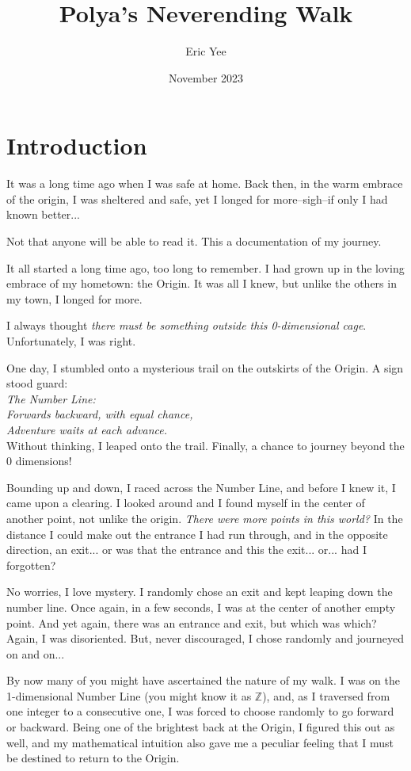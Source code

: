 \documentclass{article}
\title{Polya's Neverending Walk}
\author{Eric Yee}
\date{November 2023}
\begin{document}
\maketitle

\section{Introduction}
It was a long time ago when I was safe at home. Back then, in the warm embrace of the origin, I was sheltered and safe, yet I longed for more--sigh--if only I had known better... 

Not that anyone will be able to read it. This a documentation of my journey.

It all started a long time ago, too long to remember. I had grown up in the loving embrace of my hometown: the Origin. It was all I knew, but unlike the others in my town, I longed for more. 

I always thought \emph{there must be something outside this 0-dimensional cage}. Unfortunately, I was right.

One day, I stumbled onto a mysterious trail on the outskirts of the Origin. A sign stood guard:\\
\emph{
The Number Line: \\
Forwards backward, with equal chance,\\
Adventure waits at each advance.\\
}
Without thinking, I leaped onto the trail. Finally, a chance to journey beyond the 0 dimensions! 

Bounding up and down, I raced across the Number Line, and before I knew it, I came upon a clearing. I looked around and I found myself in the center of another point, not unlike the origin. \emph{There were more points in this world?} In the distance I could make out the entrance I had run through, and in the opposite direction, an exit... or was that the entrance and this the exit... or... had I forgotten? 


No worries, I love mystery. I randomly chose an exit and kept leaping down the number line.  Once again, in a few seconds, I was at the center of another empty point. And yet again, there was an entrance and exit, but which was which? Again, I was disoriented. But, never discouraged, I chose randomly and journeyed on and on...

By now many of you might have ascertained the nature of my walk. I was on the 1-dimensional Number Line (you might know it as $\mathbb{Z}$), and, as I traversed from one integer to a consecutive one, I was forced to choose randomly to go forward or backward. Being one of the brightest back at the Origin, I figured this out as well, and my mathematical intuition also gave me a peculiar feeling that I must be destined to return to the Origin. 
\end{document}
